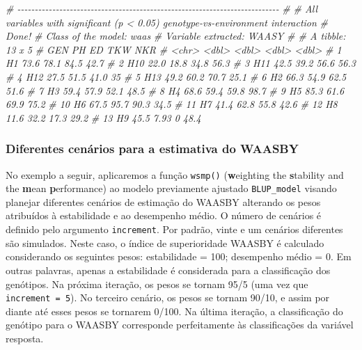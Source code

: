 \documentclass[
]{book}
\makeatletter
\newenvironment{Shaded}{\begin{snugshade}}{\end{snugshade}}
\newcommand{\CommentTok}[1]{\textcolor[rgb]{0.56,0.35,0.01}{\textit{#1}}}
\numberwithin{equation}{section}
\newcommand{\indf}[1]{\index[function]{#1@\texttt{#1()}|ST}}
\makeatother
\begin{document}
\begin{Shaded}
\begin{Highlighting}[]
\CommentTok{\# {-}{-}{-}{-}{-}{-}{-}{-}{-}{-}{-}{-}{-}{-}{-}{-}{-}{-}{-}{-}{-}{-}{-}{-}{-}{-}{-}{-}{-}{-}{-}{-}{-}{-}{-}{-}{-}{-}{-}{-}{-}{-}{-}{-}{-}{-}{-}{-}{-}{-}{-}{-}{-}{-}{-}{-}{-}{-}{-}{-}{-}{-}{-}{-}{-}{-}{-}{-}{-}{-}{-}{-}{-}{-}{-}}
\CommentTok{\# }
\CommentTok{\# All variables with significant (p \textless{} 0.05) genotype{-}vs{-}environment interaction}
\CommentTok{\# Done!}
\CommentTok{\# Class of the model: waas}
\CommentTok{\# Variable extracted: WAASY}
\CommentTok{\# \# A tibble: 13 x 5}
\CommentTok{\#    GEN      PH    ED   TKW   NKR}
\CommentTok{\#    \textless{}chr\textgreater{} \textless{}dbl\textgreater{} \textless{}dbl\textgreater{} \textless{}dbl\textgreater{} \textless{}dbl\textgreater{}}
\CommentTok{\#  1 H1     73.6 78.1   84.5  42.7}
\CommentTok{\#  2 H10    22.0 18.8   34.8  56.3}
\CommentTok{\#  3 H11    42.5 39.2   56.6  56.3}
\CommentTok{\#  4 H12    27.5 51.5   41.0  35  }
\CommentTok{\#  5 H13    49.2 60.2   70.7  25.1}
\CommentTok{\#  6 H2     66.3 54.9   62.5  51.6}
\CommentTok{\#  7 H3     59.4 57.9   52.1  48.5}
\CommentTok{\#  8 H4     68.6 59.4   59.8  98.7}
\CommentTok{\#  9 H5     85.3 61.6   69.9  75.2}
\CommentTok{\# 10 H6     67.5 95.7   90.3  34.5}
\CommentTok{\# 11 H7     41.4 62.8   55.8  42.6}
\CommentTok{\# 12 H8     11.6 32.2   17.3  29.2}
\CommentTok{\# 13 H9     45.5  7.93   0    48.4}
\end{Highlighting}
\end{Shaded}

\hypertarget{diferentes-cenuxe1rios-para-a-estimativa-do-waasby}{%
\subsubsection{Diferentes cenários para a estimativa do WAASBY}\label{diferentes-cenuxe1rios-para-a-estimativa-do-waasby}}

No exemplo a seguir, aplicaremos a função \texttt{wsmp()} \indf{wsmp} (\textbf{w}eighting the \textbf{s}tability and the \textbf{m}ean \textbf{p}erformance) ao modelo previamente ajustado \texttt{BLUP\_model} visando planejar diferentes cenários de estimação do WAASBY alterando os pesos atribuídos à estabilidade e ao desempenho médio. O número de cenários é definido pelo argumento \texttt{increment}. Por padrão, vinte e um cenários diferentes são simulados. Neste caso, o índice de superioridade WAASBY é calculado considerando os seguintes pesos: estabilidade = 100; desempenho médio = 0. Em outras palavras, apenas a estabilidade é considerada para a classificação dos genótipos. Na próxima iteração, os pesos se tornam 95/5 (uma vez que \texttt{increment\ =\ 5}). No terceiro cenário, os pesos se tornam 90/10, e assim por diante até esses pesos se tornarem 0/100. Na última iteração, a classificação do genótipo para o WAASBY corresponde perfeitamente às classificações da variável resposta.
\end{document}
